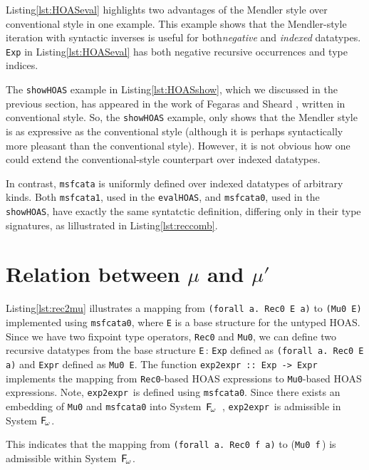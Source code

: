 \documentclass[a4paper,UKenglish]{lipics}
\newcommand{\Fw}[0]{{\ensuremath{\mathsf{\uppercase{F}}_{\!\omega}}}}
\begin{document}
Listing\;\ref{lst:HOASeval} highlights two advantages of the Mendler style over
conventional style in one example. This example shows that the Mendler-style
iteration with syntactic inverses is useful for both\textit{negative} and
\textit{indexed} datatypes. \lstinline{Exp} in Listing\;\ref{lst:HOASeval} has
both negative recursive occurrences and type indices.

The \lstinline{showHOAS} example in Listing\;\ref{lst:HOASshow},
which we discussed in the previous section, has appeared in the work
of Fegaras and Sheard \cite{FegShe96}, written in conventional style.
So, the \lstinline{showHOAS} example, only shows that the Mendler style is
as expressive as the conventional style (although it is
perhaps syntactically more pleasant than the conventional style).
However, it is not obvious how one could extend the conventional-style
counterpart over indexed datatypes.

In contrast, \lstinline{msfcata} is uniformly defined over indexed datatypes of
arbitrary kinds. Both \lstinline{msfcata1}, used in the \lstinline{evalHOAS},
and \lstinline{msfcata0}, used in the \lstinline{showHOAS}, have exactly
the same syntatctic definition, differing only in their type signatures,
as lillustrated in Listing\;\ref{lst:reccomb}.

\section{Relation between $\mu$ and $\mu'$}
Listing\;\ref{lst:rec2mu} illustrates a mapping from
\lstinline{(forall a. Rec0 E a)}  to \lstinline{(Mu0 E)} implemented
using \lstinline{msfcata0}, where \lstinline{E} is a base structure
for the untyped HOAS. Since we have two fixpoint type operators,
\lstinline{Rec0} and \lstinline{Mu0}, we can define two recursive datatypes
from the base structure \lstinline{E}\,:
\lstinline{Exp} defined as \lstinline{(forall a. Rec0 E a)} and
\lstinline{Expr} defined as \lstinline{Mu0 E}.
The function \lstinline{exp2expr :: Exp -> Expr}\, implements the mapping from
\lstinline{Rec0}-based HOAS expressions to \lstinline{Mu0}-based
HOAS expressions. Note, \lstinline{exp2expr}\, is defined
using \lstinline{msfcata0}.  Since there exists an embedding of
\lstinline{Mu0} and \lstinline{msfcata0} into System~\Fw\ \cite{AhnShe11},
\lstinline{exp2expr}\, is admissible in System \Fw.


This indicates that the mapping
from \lstinline{(forall a. Rec0 f a)} to (\lstinline{Mu0 f}\,) is admissible
within System~\Fw.
\end{document}
